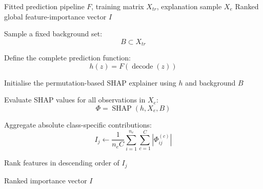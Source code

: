\documentclass{elektr}
\begin{document}
\begin{algorithm}[H]
\caption{Permutation-SHAP Procedure for Global Model Auditing}
\label{alg:shap}
\small
\begin{algorithmic}[1]

\Require Fitted prediction pipeline $F$, training matrix $X_{tr}$,
explanation sample $X_e$
\Ensure Ranked global feature-importance vector $I$

\State Sample a fixed background set:
\[
B\subset X_{tr}
\]

\State Define the complete prediction function:
\[
h(z)=F(\operatorname{decode}(z))
\]

\State Initialise the permutation-based SHAP explainer
using $h$ and background $B$

\State Evaluate SHAP values for all observations in $X_e$:
\[
\Phi=\operatorname{SHAP}(h,X_e,B)
\]


    \State Aggregate absolute class-specific contributions:
    \[
    I_j\gets
    \frac{1}{n_eC}
    \sum_{i=1}^{n_e}
    \sum_{c=1}^{C}
    \left|\Phi_{ij}^{(c)}\right|
    \]

\EndFor

\State Rank features in descending order of $I_j$

\State \Return Ranked importance vector $I$

\end{algorithmic}
\end{algorithm}

\FloatBarrier
\end{document}
